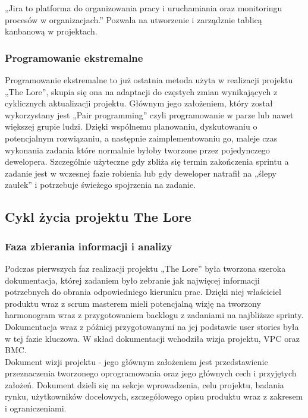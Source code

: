 \documentclass[oneside,polski,logo]{amuthesis}
\begin{document}
„Jira to platforma do organizowania pracy i uruchamiania oraz monitoringu procesów w organizacjach.”  \cite{jira} Pozwala na utworzenie i zarządznie tablicą kanbanową w projektach.

\subsubsection{Programowanie ekstremalne}

Programowanie ekstremalne to już ostatnia metoda użyta w realizacji projektu „The Lore”, skupia się ona na adaptacji do częstych zmian wynikających z cyklicznych aktualizacji projektu. Głównym jego założeniem, który został wykorzystany jest „Pair programming” czyli programowanie w parze lub nawet większej grupie ludzi. Dzięki wspólnemu planowaniu, dyskutowaniu o potencjalnym rozwiązaniu, a następnie zaimplementowaniu go, maleje czas wykonania zadania które normalnie byłoby tworzone przez pojedynczego dewelopera. Szczególnie użyteczne gdy zbliża się termin zakończenia sprintu a zadanie jest w wczesnej fazie robienia lub gdy deweloper natrafił na „ślepy zaułek” i potrzebuje świeżego spojrzenia na zadanie. \\

\subsection{Cykl życia projektu The Lore}

\subsubsection{Faza zbierania informacji i analizy}

Podczas pierwszych faz realizacji projektu „The Lore” była tworzona szeroka dokumentacja, której zadaniem było zebranie jak najwięcej informacji potrzebnych do obrania odpowiedniego kierunku prac. Dzięki niej właściciel produktu wraz z scrum masterem mieli potencjalną wizję na tworzony harmonogram wraz z przygotowaniem backlogu z zadaniami na najbliższe sprinty. Dokumentacja wraz z później przygotowanymi na jej podstawie user stories była w tej fazie kluczowa. W skład dokumentacji wchodziła wizja projektu, VPC oraz BMC.\\

Dokument wizji projektu - jego głównym założeniem jest przedstawienie przeznaczenia tworzonego oprogramowania oraz jego głównych cech i przyjętych założeń. Dokument dzieli się na sekcje wprowadzenia, celu projektu, badania rynku, użytkowników docelowych, szczegółowego opisu produktu wraz z zakresem i ograniczeniami. \\
\end{document}
